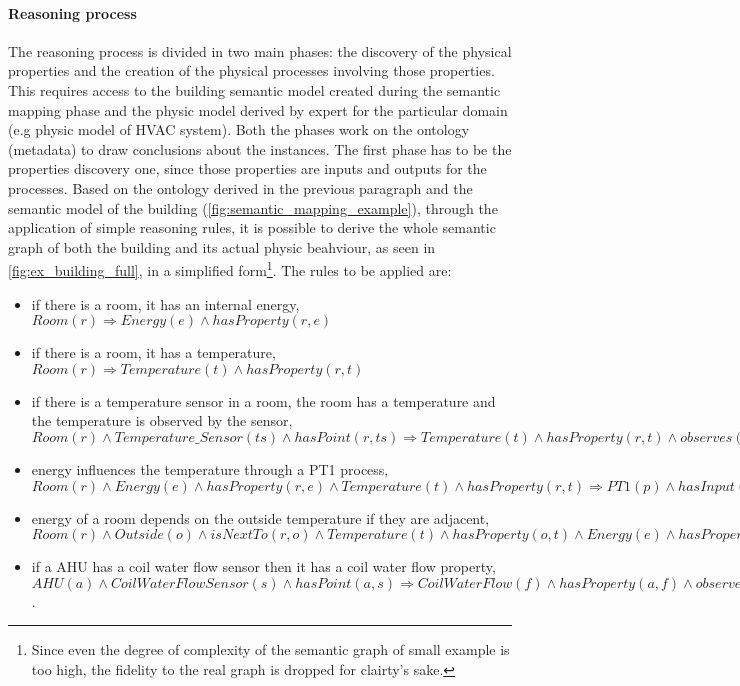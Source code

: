 \paragraph{Reasoning process}
The reasoning process is divided in two main phases: the discovery of the physical properties and the creation of the physical processes involving those properties. This requires access to the building semantic model created during the semantic mapping phase and the physic model derived by expert for the particular domain (e.g physic model of HVAC system). Both the phases work on the ontology (metadata) to draw conclusions about the instances. The first phase has to be the properties discovery one, since those properties are inputs and outputs for the processes. Based on the ontology derived in the previous paragraph and the semantic model of the building (\autoref{fig:semantic_mapping_example}), through the application of simple reasoning rules, it is possible to derive the whole semantic graph of both the building and its actual physic beahviour, as seen in \autoref{fig:ex_building_full}, in a simplified form\footnote{Since even the degree of complexity of the semantic graph of small example is too high, the fidelity to the real graph is dropped for clairty's sake.}.
The rules to be applied are:
\begin{itemize}
  \item if there is a room, it has an internal energy, $Room(r)\Rightarrow Energy(e)\land hasProperty(r,e)$
  \item if there is a room, it has a temperature, $Room(r)\Rightarrow Temperature(t)\land hasProperty(r,t)$
  \item if there is a temperature sensor in a room, the room has a temperature and the temperature is observed by the sensor, $Room(r)\land Temperature\_Sensor(ts)\land hasPoint(r,ts)\Rightarrow Temperature(t)\land hasProperty(r,t)\land observes(s,t)$
  \item energy influences the temperature through a PT1 process, $Room(r)\land Energy(e)\land hasProperty(r,e)\land Temperature(t)\land hasProperty(r,t)\Rightarrow PT1(p)\land hasInput(p,e)\land hasOutput(p,t)$
  \item energy of a room depends on the outside temperature if they are adjacent, $Room(r)\land Outside(o)\land isNextTo(r,o)\land Temperature(t)\land hasProperty(o,t)\land Energy(e)\land hasProperty(r,e)\Rightarrow PP(p)\land hasInput(p,t)\land hasOutput(p,e)$
  \item if a AHU has a coil water flow sensor then it has a coil water flow property, $AHU(a)\land CoilWaterFlowSensor(s)\land hasPoint(a,s)\Rightarrow CoilWaterFlow(f)\land hasProperty(a,f)\land observes(s,f)$.
\end{itemize}
